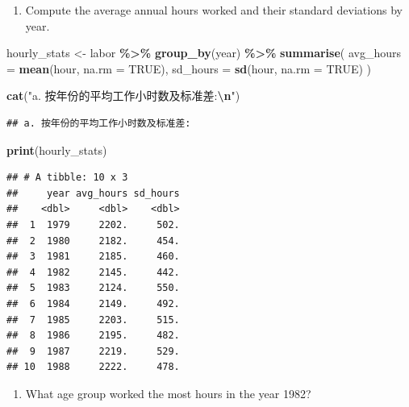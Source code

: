 \documentclass[
]{article}
\newenvironment{Shaded}{\begin{snugshade}}{\end{snugshade}}
\newcommand{\AttributeTok}[1]{\textcolor[rgb]{0.13,0.29,0.53}{#1}}
\newcommand{\ConstantTok}[1]{\textcolor[rgb]{0.56,0.35,0.01}{#1}}
\newcommand{\FunctionTok}[1]{\textcolor[rgb]{0.13,0.29,0.53}{\textbf{#1}}}
\newcommand{\NormalTok}[1]{#1}
\newcommand{\OtherTok}[1]{\textcolor[rgb]{0.56,0.35,0.01}{#1}}
\newcommand{\SpecialCharTok}[1]{\textcolor[rgb]{0.81,0.36,0.00}{\textbf{#1}}}
\newcommand{\StringTok}[1]{\textcolor[rgb]{0.31,0.60,0.02}{#1}}
\providecommand{\tightlist}{%
  \setlength{\itemsep}{0pt}\setlength{\parskip}{0pt}}
\begin{document}
\begin{enumerate}
\def\labelenumi{\alph{enumi}.}
\tightlist
\item
  Compute the average annual hours worked and their standard deviations
  by year.
\end{enumerate}

\begin{Shaded}
\begin{Highlighting}[]
\NormalTok{hourly\_stats }\OtherTok{\textless{}{-}}\NormalTok{ labor }\SpecialCharTok{\%\textgreater{}\%}
  \FunctionTok{group\_by}\NormalTok{(year) }\SpecialCharTok{\%\textgreater{}\%}
  \FunctionTok{summarise}\NormalTok{(}
    \AttributeTok{avg\_hours =} \FunctionTok{mean}\NormalTok{(hour, }\AttributeTok{na.rm =} \ConstantTok{TRUE}\NormalTok{),}
    \AttributeTok{sd\_hours =} \FunctionTok{sd}\NormalTok{(hour, }\AttributeTok{na.rm =} \ConstantTok{TRUE}\NormalTok{)}
\NormalTok{  )}

\FunctionTok{cat}\NormalTok{(}\StringTok{"a. 按年份的平均工作小时数及标准差:}\SpecialCharTok{\textbackslash{}n}\StringTok{"}\NormalTok{)}
\end{Highlighting}
\end{Shaded}

\begin{verbatim}
## a. 按年份的平均工作小时数及标准差:
\end{verbatim}

\begin{Shaded}
\begin{Highlighting}[]
\FunctionTok{print}\NormalTok{(hourly\_stats)}
\end{Highlighting}
\end{Shaded}

\begin{verbatim}
## # A tibble: 10 x 3
##     year avg_hours sd_hours
##    <dbl>     <dbl>    <dbl>
##  1  1979     2202.     502.
##  2  1980     2182.     454.
##  3  1981     2185.     460.
##  4  1982     2145.     442.
##  5  1983     2124.     550.
##  6  1984     2149.     492.
##  7  1985     2203.     515.
##  8  1986     2195.     482.
##  9  1987     2219.     529.
## 10  1988     2222.     478.
\end{verbatim}

\begin{enumerate}
\def\labelenumi{\alph{enumi}.}
\setcounter{enumi}{1}
\tightlist
\item
  What age group worked the most hours in the year 1982?
\end{enumerate}
\end{document}

